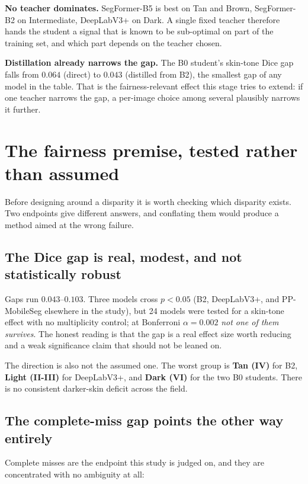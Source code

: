 \documentclass[11pt,a4paper]{article}
\begin{document}
\textbf{No teacher dominates.} SegFormer-B5 is best on Tan and Brown,
SegFormer-B2 on Intermediate, DeepLabV3+ on Dark. A single fixed teacher
therefore hands the student a signal that is known to be sub-optimal on part of
the training set, and which part depends on the teacher chosen.

\textbf{Distillation already narrows the gap.} The B0 student's skin-tone Dice
gap falls from $0.064$ (direct) to $0.043$ (distilled from B2), the smallest gap
of any model in the table. That is the fairness-relevant effect this stage tries
to extend: if one teacher narrows the gap, a per-image choice among several
plausibly narrows it further.

\section{The fairness premise, tested rather than assumed}
\label{sec:fairness}

Before designing around a disparity it is worth checking which disparity exists.
Two endpoints give different answers, and conflating them would produce a method
aimed at the wrong failure.

\subsection{The Dice gap is real, modest, and not statistically robust}

Gaps run $0.043$--$0.103$. Three models cross $p<0.05$ (B2, DeepLabV3+, and
PP-MobileSeg elsewhere in the study), but 24 models were tested for a skin-tone
effect with no multiplicity control; at Bonferroni $\alpha = 0.002$ \emph{not one
of them survives}. The honest reading is that the gap is a real effect size worth
reducing and a weak significance claim that should not be leaned on.

The direction is also not the assumed one. The worst group is
\textbf{Tan (IV)} for B2, \textbf{Light (II-III)} for DeepLabV3+, and
\textbf{Dark (VI)} for the two B0 students. There is no consistent
darker-skin deficit across the field.

\subsection{The complete-miss gap points the other way entirely}

Complete misses are the endpoint this study is judged on, and they are
concentrated with no ambiguity at all:
\end{document}

